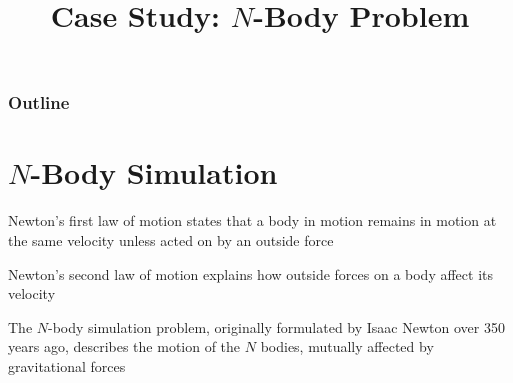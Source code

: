 \documentclass[8pt,a4paper,compress]{beamer}
\title{Case Study: $N$-Body Problem}
\date{}
\begin{document}
\begin{frame}
\vfill
\titlepage
\end{frame}

\begin{frame}
\frametitle{Outline}
\tableofcontents
\end{frame}

\section{$N$-Body Simulation}
\begin{frame}[fragile]
\pause

Newton's first law of motion states that a body in motion remains in motion at the same velocity unless acted on by an outside force

\pause
\bigskip

Newton's second law of motion explains how outside forces on a body affect its velocity

\pause
\bigskip

The $N$-body simulation problem, originally formulated by Isaac Newton over 350 years ago, describes the motion of the $N$ bodies, mutually affected by gravitational forces
\end{frame}
\end{document}
